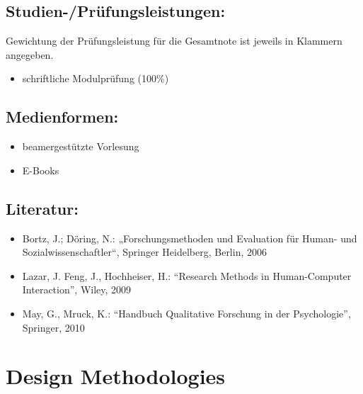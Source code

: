 \section*{Studien-/Prüfungsleistungen:\label{/mi-2017/modulbeschreibungen-master/MA_All_Research_Methods}}\label{studien-pruxfcfungsleistungenpathlabelmi-2017modulbeschreibungen-mastermaux5fallux5fresearchux5fmethods}

Gewichtung der Prüfungsleistung für die Gesamtnote ist jeweils in
Klammern angegeben.

\begin{itemize}
\tightlist
\item
  schriftliche Modulprüfung (100\%)
\end{itemize}

\section*{Medienformen:\label{/mi-2017/modulbeschreibungen-master/MA_All_Research_Methods}}\label{medienformenpathlabelmi-2017modulbeschreibungen-mastermaux5fallux5fresearchux5fmethods}

\begin{itemize}
\tightlist
\item
  beamergestützte Vorlesung
\item
  E-Books
\end{itemize}

\section*{Literatur:\label{/mi-2017/modulbeschreibungen-master/MA_All_Research_Methods}}\label{literaturpathlabelmi-2017modulbeschreibungen-mastermaux5fallux5fresearchux5fmethods}

\begin{itemize}
\tightlist
\item
  Bortz, J.; Döring, N.: „Forschungsmethoden und Evaluation für Human-
  und Sozialwissenschaftler``, Springer Heidelberg, Berlin, 2006
\item
  Lazar, J. Feng, J., Hochheiser, H.: ``Research Methods in
  Human-Computer Interaction'', Wiley, 2009
\item
  May, G., Mruck, K.: ``Handbuch Qualitative Forschung in der
  Psychologie'', Springer, 2010
\end{itemize}

\chapter{Design
Methodologies\label{/mi-2017/modulbeschreibungen-master/MA_HCI_Design_Methodologies}}\label{design-methodologiespathlabelmi-2017modulbeschreibungen-mastermaux5fhciux5fdesignux5fmethodologies}

